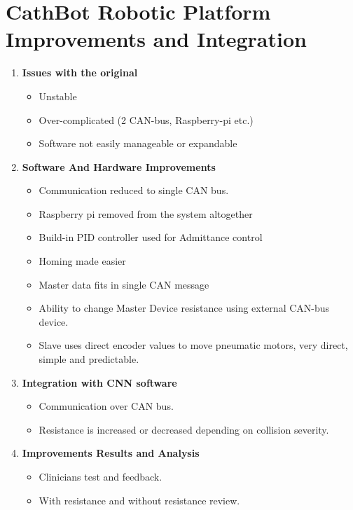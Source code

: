 \chapter{CathBot Robotic Platform Improvements and Integration}
\label{ch:simulation-and-detection}

\begin{enumerate}

    \item \textbf{Issues with the original}
    \begin{itemize} 
        \item Unstable
        \item Over-complicated (2 CAN-bus, Raspberry-pi etc.)
        \item Software not easily manageable or expandable
    \end{itemize}
    
    \item \textbf{Software And Hardware Improvements}
    \begin{itemize} 
        \item Communication reduced to single CAN bus.
        \item Raspberry pi removed from the system altogether
        \item Build-in PID controller used for Admittance control
        \item Homing made easier
        \item Master data fits in single CAN message
        \item Ability to change Master Device resistance using external CAN-bus device.
        \item Slave uses direct encoder values to move pneumatic motors, very direct, simple and predictable.
    \end{itemize}

    \item \textbf{Integration with CNN software}
    \begin{itemize} 
        \item Communication over CAN bus.
        \item Resistance is increased or decreased depending on collision severity.
    \end{itemize}
    
    \item \textbf{Improvements Results and Analysis}
    \begin{itemize} 
        \item Clinicians test and feedback.
        \item With resistance and without resistance review.
    \end{itemize}
\end{enumerate}
